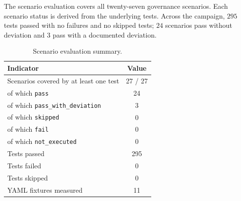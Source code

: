 \documentclass[10pt]{article}
\begin{document}
The scenario evaluation covers all twenty-seven governance scenarios.
Each scenario status is derived from the underlying tests. Across the
campaign, $295$ tests passed with no failures and no skipped tests;
$24$ scenarios pass without deviation and $3$ pass with a documented
deviation.

\begin{table}[htbp]
	\centering
	\caption{Scenario evaluation summary.}
	\label{tab:app-eval-summary}
	\small
	\begin{tabular}{@{}lc@{}}
		\toprule
		\textbf{Indicator} & \textbf{Value} \\
		\midrule
		Scenarios covered by at least one test & 27 / 27 \\
		\quad of which \texttt{pass} & 24 \\
		\quad of which \texttt{pass\_with\_deviation} & 3 \\
		\quad of which \texttt{skipped} & 0 \\
		\quad of which \texttt{fail} & 0 \\
		\quad of which \texttt{not\_executed} & 0 \\
		Tests passed & 295 \\
		Tests failed & 0 \\
		Tests skipped & 0 \\
		YAML fixtures measured & 11 \\
		\bottomrule
	\end{tabular}
\end{table}
\end{document}
